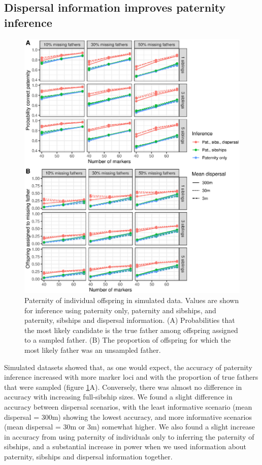 \documentclass[10pt, a4paper, twocolumn]{article} %
\begin{document}
\subsection{Dispersal information improves paternity inference}

\begin{figure}
    \centering
    \includegraphics{fig-sim_paternity.eps}
    \caption{
        Paternity of individual offspring in simulated data.
        Values are shown for inference using paternity only, paternity and sibships, and paternity, sibships and dispersal information.
        (A) Probabilities that the most likely candidate is the true father among offspring assigned to a sampled father.
        (B) The proportion of offspring for which the most likely father was an unsampled father.
    }
    \label{fig:sim-paternity}
\end{figure}

Simulated datasets showed that, as one would expect, the accuracy of paternity inference increased with more marker loci and with the proportion of true fathers that were sampled (figure \ref{fig:sim-paternity}A).
Conversely, there was almost no difference in accuracy with increasing full-sibship sizes.
We found a slight difference in accuracy between dispersal scenarios, with the least informative scenario (mean dispersal = 300m) showing the lowest accuracy, and more informative scenarios (mean dispersal = 30m or 3m) somewhat higher.
We also found a slight increase in accuracy from using paternity of individuals only to inferring the paternity of sibships, and a substantial increase in power when we used information about paternity, sibships and dispersal information together. 
\end{document}
